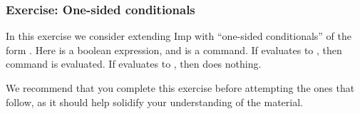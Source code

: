 \documentclass[12pt]{report}
\begin{document}
\subsubsection{Exercise: One-sided conditionals}



 In this exercise we consider extending Imp with ``one-sided
    conditionals'' of the form     . Here  is a boolean
    expression, and  is a command. If  evaluates to , then
    command  is evaluated. If  evaluates to , then  
       does nothing.


    We recommend that you complete this exercise before attempting the
    ones that follow, as it should help solidify your understanding of
    the material. 
\end{document}
